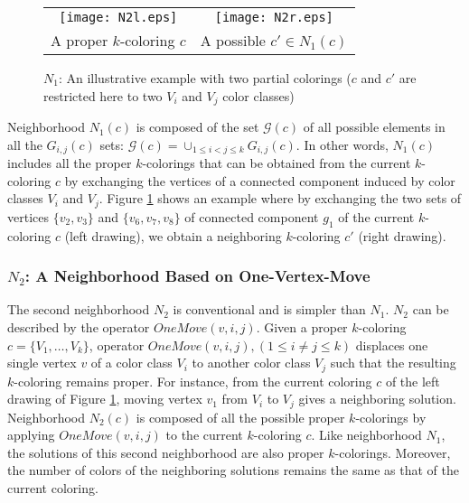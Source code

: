 \documentclass{elsart}
\begin{document}
\begin{figure}[h]
\begin{center}
\begin{tabular}{c@{\qquad\qquad}c}
\texttt{[image: N2l.eps]} & \texttt{[image: N2r.eps]}\\
A proper $k$-coloring $c$ & A possible $c' \in N_1(c)$
\end{tabular}
\caption{$N_1$: An illustrative example with two partial colorings ($c$ and $c'$ are restricted here to two $V_i$ and $V_j$ color classes)}
\label{fig_chain_swap}
\end{center}
\end{figure}

Neighborhood $N_1(c)$ is composed of the set $\mathcal{G}(c)$ of all possible elements in all the $G_{i, j}(c)$ sets: $\mathcal{G}(c) = \cup_{1 \le i < j \le k} G_{i, j}(c)$. In other words, $N_1(c)$ includes all the proper $k$-colorings that can be obtained from the current $k$-coloring $c$ by exchanging the vertices of a connected component induced by color classes $V_i$ and $V_j$. Figure \ref{fig_chain_swap} shows an example where by exchanging the two sets of vertices $\{v_2, v_3\}$ and $\{v_6, v_7, v_8\}$ of connected component $g_1$ of the current $k$-coloring $c$ (left drawing), we obtain a neighboring $k$-coloring $c'$ (right drawing).


\subsubsection{$N_2$: A Neighborhood Based on One-Vertex-Move}
\label{subsec_sol_one_move_tabu}

The second neighborhood $N_2$ is conventional and is simpler than $N_1$. $N_2$ can be described by the operator $OneMove(v,i,j)$. Given a proper $k$-coloring $c = \{V_1, \ldots, V_k\}$, operator $OneMove(v,i,j), (1 \le i \neq j \le k)$ displaces one single vertex $v$ of a color class $V_i$ to another color class $V_j$ such that the resulting $k$-coloring remains proper. For instance, from the current coloring $c$ of the left drawing of Figure \ref{fig_chain_swap}, moving vertex $v_1$ from $V_i$ to $V_j$ gives a neighboring solution. Neighborhood $N_2(c)$ is composed of all the possible proper $k$-colorings by applying $OneMove(v,i,j)$ to the current $k$-coloring $c$. Like neighborhood $N_1$, the solutions of this second neighborhood are also proper $k$-colorings. Moreover, the number of colors of the neighboring solutions remains the same as that of the current coloring.
\end{document}

